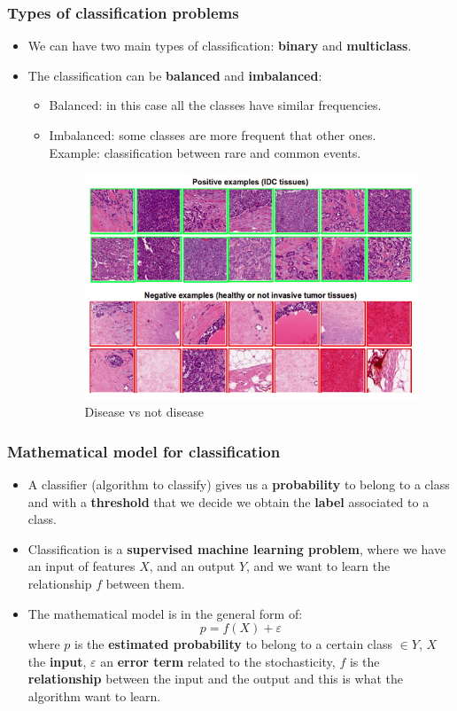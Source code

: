 \documentclass[9pt]{beamer}
\begin{document}
\begin{frame}
\frametitle{Types of classification problems}
\begin{itemize}
\item We can have two main types of classification: \textbf{binary} and \textbf{multiclass}.
\item The classification can be \textbf{balanced} and \textbf{imbalanced}:
\begin{itemize}
\item Balanced: in this case all the classes have similar frequencies.
\item Imbalanced: some classes are more frequent that other ones.\\ Example: classification between rare and common events.
\vspace{5mm}
\begin{figure}[ht]
\includegraphics[scale=0.30]{images/tumor.png}
\caption{Disease vs not disease}
\end{figure}
\end{itemize}
\end{itemize}
\end{frame}

\begin{frame}
\frametitle{Mathematical model for classification}
\begin{itemize}
\item A classifier (algorithm to classify) gives us a \textbf{probability} to belong to a class and with a \textbf{threshold} that we decide we obtain the \textbf{label} associated to a class.
\item Classification is a \textbf{supervised machine learning problem}, where we have an input of features $X$, and an output $Y$, and we want to learn the relationship $f$ between them.
\item The mathematical model is in the general form of:
$$
p = f(X) + \varepsilon
$$
where $p$ is the \textbf{estimated probability} to belong to a certain class $\in Y$, $X$ the \textbf{input}, $\varepsilon$ an \textbf{error term} related to the stochasticity, $f$ is the \textbf{relationship} between the input and the output and this is what the algorithm want to learn.
\end{itemize}
\end{frame}
\end{document}
